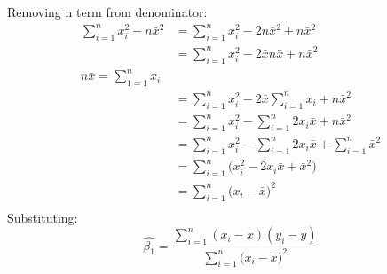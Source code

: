 \documentclass{article}
\begin{document}
Removing n term from denominator:
\begin{align*}
\sum_{i=1}^{n}x_i^2 - n\bar{x}^2 & = \sum_{i=1}^{n}x_i^2 - 2n\bar{x}^2 + n\bar{x}^2 \\ %
& = \sum_{i=1}^{n}x_i^2 - 2\bar{x}n\bar{x} + n\bar{x}^2 \\ %
n\bar{x} = \sum_{1=1}^{n}x_i \\ %
& = \sum_{i=1}^{n}x_i^2 - 2\bar{x}\sum_{i=1}^{n}x_i + n\bar{x}^2 \\
& = \sum_{i=1}^{n}x_i^2 - \sum_{i=1}^{n}2x_i\bar{x} + n\bar{x}^2 \\
& = \sum_{i=1}^{n}x_i^2 - \sum_{i=1}^{n}2x_i\bar{x} + \sum_{i=1}^{n}\bar{x}^2 \\
& = \sum_{i=1}^{n}\big(x_i^2 - 2x_i\bar{x} + \bar{x}^2\big) \\
& = \sum_{i=1}^{n}\big(x_i - \bar{x}\big)^2 \\
\end{align*}
Substituting:
$$
\hat{\beta_1}=  \frac{\sum_{i=1}^{n}(x_i - \bar{x})(y_i - \bar{y})}{\sum_{i=1}^{n}\big(x_i - \bar{x}\big)^2}
$$
\end{document}
